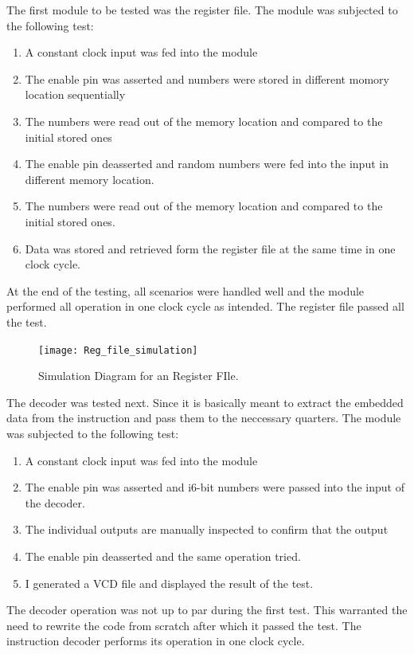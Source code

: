 The first module to be tested was the register file. The module was subjected to the following test:
\begin{enumerate}
\item A constant clock input was fed into the module
\item The enable pin was asserted and numbers were stored in different momory location sequentially
\item The numbers were read out of the memory location and compared to the initial stored ones
\item The enable pin deasserted and random numbers were fed into the input in different memory location.
\item The numbers were read out of the memory location and compared to the initial stored ones.
\item Data was stored and retrieved form the register file at the same time in one clock cycle.

\end{enumerate}
At the end of the testing, all scenarios were handled well and the module performed all operation in one clock cycle as intended. The register file passed all the test.


\begin{figure}
    \centering
    \texttt{[image: Reg\_file\_simulation]}
	\caption{Simulation Diagram for an Register FIle.}
    \label{fig:reg_sim}
\end{figure}

The decoder was tested next. Since it is basically meant to extract the embedded data from the instruction and pass them to the neccessary quarters. The module was subjected to the following test:
\begin{enumerate}
\item A constant clock input was fed into the module
\item The enable pin was asserted and i6-bit numbers were passed into the input of the decoder.
\item The individual outputs are manually inspected to confirm that the output  
\item The enable pin deasserted and the same operation tried.
\item I generated a VCD file and displayed the result of the test.
\end{enumerate}
The decoder operation was not up to par during the first test. This warranted the need to rewrite the code from scratch after which it passed the test. The instruction decoder performs its operation in one clock cycle.

